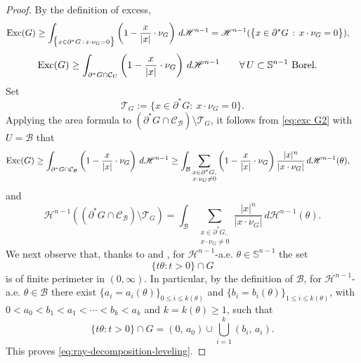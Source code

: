 \documentclass[reqno,11pt]{amsart}
\numberwithin{equation}{section}
\theoremstyle{remark}
\begin{document}
\begin{proof}
By the definition of excess,
\begin{equation}\label{eq:exc G1}
\begin{split}
{\rm Exc}(G )&\geq \int_{\big\{x \in \partial^*G\,:\, x\cdot \nu_{G}=0\big\} } \left(1- \frac{x}{|x|}\cdot \nu_{G } \right) \, d\mathscr H^{n-1}=\mathscr H^{n-1}(\big\{x \in \partial^*G\,:\, x\cdot \nu_{G}=0\big\} ),
\end{split}
\end{equation}
\begin{equation}\label{eq:exc G2}
\begin{split}
{\rm Exc}(G )&\geq \int_{\partial^*G \cap \mathcal{C}_{U}} \left(1- \frac{x}{|x|}\cdot \nu_{G } \right) \, d\mathscr H^{n-1} \qquad \forall\,U \subset \mathbb S^{n-1} \text{ Borel.}
\end{split}
\end{equation}
Set
$$
\mathcal T_G:=\big\{x\in\partial^*G:\ x\cdot\nu_G=0\big\}.
$$
Applying the area formula \cite[Theorem 1, Section 3.3.3]{EG1992} to
$(\partial^*G\cap\mathcal C_{\mathcal B})\setminus\mathcal T_G$, it follows from
\eqref{eq:exc G2} with $U=\mathcal B$ that
\begin{align}
{\rm Exc}(G )&\geq \int_{\partial^*G\cap \mathcal C_{\mathcal B}}  \left(1-\frac{x}{|x|}\cdot \nu_G \right)\, d\mathscr H^{n-1} \geq  \int_{\mathcal B } \sum_{\substack{x\in \partial^*G,\\ x\cdot \nu_{G }\neq 0}} \left(1- \frac{x}{|x|}\cdot \nu_{G } \right)\frac{|x|^{n}}{ |x \cdot \nu_{G }|}\, d\mathscr H^{n-1}(\theta),\label{excess G in cone}
\end{align}
and
\begin{equation}\label{measure G in cone}
    \mathscr H^{n-1}((\partial^* G\cap \mathcal C_{\mathcal B})\setminus\mathcal T_G)=\int_{\mathcal B } \sum_{\substack{x\in \partial^*G,\\ x\cdot \nu_{G }\neq 0}} \frac{|x|^{n}}{ |x \cdot \nu_{G }|}\, d\mathscr H^{n-1}(\theta).
\end{equation}
We next observe that, thanks to \cite[Chapters 3.2 and 3.11]{AFP2000} and \cite[Theorem~G]{CCF2005}, for $\mathscr H^{n-1}$-a.e. $\theta\in \mathbb S^{n-1}$ the set 
$$\{t\theta\colon t>0\}\cap G $$
 is of finite perimeter in $(0,\infty)$. In particular, by the definition of $\mathcal B $, for $\mathscr H^{n-1}$-a.e. $\theta \in \mathcal B $  there exist  $\{a_i=a_i(\theta)\}_{0\leq i \leq k(\theta)}$ and $\{b_i=b_i(\theta)\}_{1\leq i \leq k(\theta)}$, with $0<a_0<b_1<a_1<\cdots<b_{k}<a_k$ and $k=k(\theta)\ge 1$, such that
\begin{equation*} 
    \{t\theta\colon t>0\}\cap G = (0,\,a_0) \cup \bigcup_{i=1}^{k}(b_i,\,a_i).
\end{equation*}  
This proves \eqref{eq:ray-decomposition-leveling}.


\end{proof}
\end{document}
